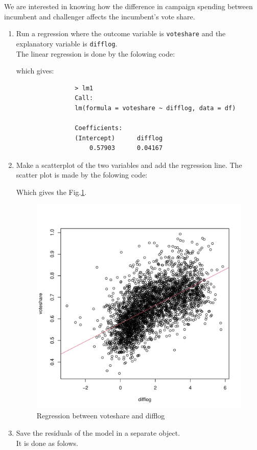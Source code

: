 \documentclass[12pt,letterpaper]{article}
\begin{document}
\noindent We are interested in knowing how the difference in campaign spending between incumbent and challenger affects the incumbent's vote share. 
	\begin{enumerate}
		\item Run a regression where the outcome variable is \texttt{voteshare} and the explanatory variable is \texttt{difflog}.	 \\
			The linear regression is done by the folowing code:
			  
			which gives:
			\begin{verbatim}
				> lm1
				Call:
				lm(formula = voteshare ~ difflog, data = df)
				
				Coefficients:
				(Intercept)      difflog  
				    0.57903      0.04167 
			\end{verbatim}	
		\item Make a scatterplot of the two variables and add the regression line. 
			The scatter plot is made by the folowing code:
			  
			Which gives the Fig.\ref{fig:lm_1}. \\
				
			\begin{figure}[h!]\centering
				\caption{\footnotesize Regression between voteshare and difflog}
				\label{fig:lm_1}
				\includegraphics[width=.85\textwidth]{lm1.pdf}
			\end{figure}
		\item Save the residuals of the model in a separate object.\\
			It is done as folows.\\
			

\end{enumerate}
\end{document}
